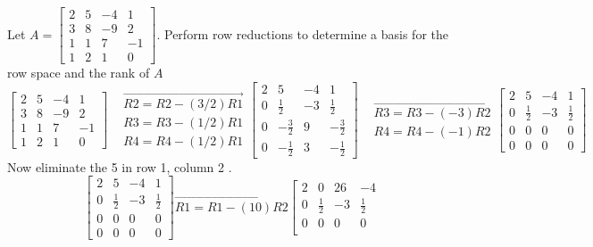 \documentclass[../main.tex]{subfiles}
\begin{document}
\begin{example}  Let $A=\left[\begin{array}{cccc}2 & 5 & -4 & 1 \\ 3 & 8 & -9 & 2 \\ 1 & 1 & 7 & -1 \\ 1 & 2 & 1 & 0\end{array}\right]$. Perform row reductions to determine a basis for the row space and the rank
of $A$
$$
\left[\begin{array}{cccc}
2 & 5 & -4 & 1 \\
3 & 8 & -9 & 2 \\
1 & 1 & 7 & -1 \\
1 & 2 & 1 & 0
\end{array}\right] \begin{aligned}
&\overrightarrow{R 2=R 2-(3 / 2) R 1} \\
&R 3=R 3-(1 / 2) R 1 \\
&R 4=R 4-(1 / 2) R 1
\end{aligned}\left[\begin{array}{cccc}
2 & 5 & -4 & 1 \\
0 & \frac{1}{2} & -3 & \frac{1}{2} \\
0 & -\frac{3}{2} & 9 & -\frac{3}{2} \\
0 & -\frac{1}{2} & 3 & -\frac{1}{2}
\end{array}\right] \begin{aligned}
&\overrightarrow{R 3=R 3-(-3) R 2} \\
&R 4=R 4-(-1) R 2
\end{aligned}\left[\begin{array}{cccc}
2 & 5 & -4 & 1 \\
0 & \frac{1}{2} & -3 & \frac{1}{2} \\
0 & 0 & 0 & 0 \\
0 & 0 & 0 & 0
\end{array}\right]
$$
Now eliminate the 5 in row 1, column 2 .
$$
\left[\begin{array}{cccc}
2 & 5 & -4 & 1 \\
0 & \frac{1}{2} & -3 & \frac{1}{2} \\
0 & 0 & 0 & 0 \\
0 & 0 & 0 & 0
\end{array}\right] \overrightarrow{R 1=R 1-(10) R 2}\left[\begin{array}{cccc}
2 & 0 & 26 & -4 \\
0 & \frac{1}{2} & -3 & \frac{1}{2} \\
0 & 0 & 0 & 0 \\

\end{array}$$
\end{example}
\end{document}
